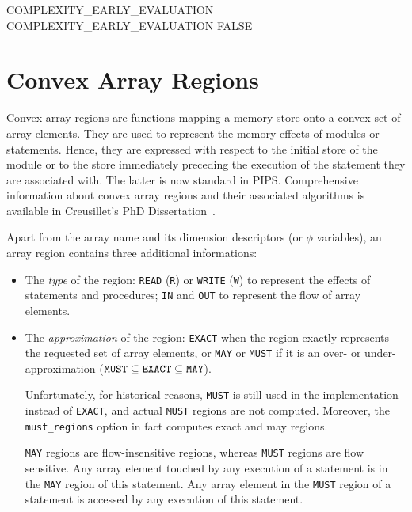 \documentclass[a4paper]{report}
\newenvironment{PipsPass}[1]{\label{pass:#1}}{}
\newcommand{\exact}[0]{{\tt EXACT}}
\newcommand{\incluseg}{\subseteq}
\newcommand{\must}[0]{{\tt MUST}}
\newcommand{\may}[0]{{\tt MAY}}
\begin{document}
\begin{PipsProp}{COMPLEXITY_EARLY_EVALUATION}
COMPLEXITY_EARLY_EVALUATION FALSE
\end{PipsProp}



\section{Convex Array Regions}
\label{subsection-array-regions}

\begin{PipsPass}{regions}


Convex array regions are functions mapping a memory store onto a convex set
of array elements. They are used to represent the memory effects of
modules or statements. Hence, they are expressed with respect to the
initial store of the module or to the store immediately preceding the
execution of the statement they are associated with. The latter is now
standard in PIPS. Comprehensive information about convex array regions
and their associated algorithms is available in Creusillet's PhD Dissertation~\cite{Cre96}.

Apart from the array name and its dimension descriptors (or
$\phi$ variables), an array region contains three additional informations:

\begin{itemize}
\item The {\em type\/} of the region: \verb+READ+ (\verb+R+) or \verb+WRITE+
(\verb+W+) to represent the effects of statements and procedures; \verb+IN+
and \verb+OUT+ to represent the flow of array elements.

\item The {\em approximation\/} of the region: \verb+EXACT+ when the region
  exactly represents the requested set of array elements, or \verb+MAY+ or
  \verb+MUST+ if it is an over- or under-approximation ($\text{\must}
  \incluseg \text{\exact} \incluseg \text{\may}$).

  Unfortunately, for historical reasons, \verb+MUST+ is still used in the
  implementation instead of \verb+EXACT+, and actual \verb+MUST+ regions are
  not computed. Moreover, the {\tt must\_regions} option in fact computes
  exact and may regions.

  \verb+MAY+ regions are flow-insensitive regions, whereas \verb+MUST+
  regions are flow sensitive. Any array element touched by any execution of
  a statement is in the \verb+MAY+ region of this statement. Any array
  element in the \verb+MUST+ region of a statement is accessed by any
  execution of this statement.


\end{itemize}
\end{PipsPass}
\end{document}

